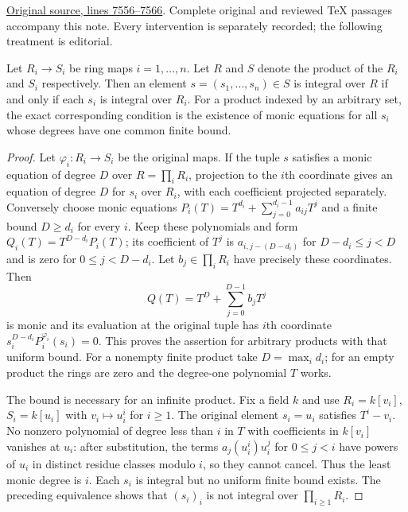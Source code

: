 \noindent\href{https://github.com/stacks/stacks-project/blob/a04446e57ec1fbc252a871afcec7752fb2807b14/algebra.tex\#L7556}{Original source, lines 7556--7566}. Complete original and reviewed TeX passages accompany this note. Every intervention is separately recorded; the following treatment is editorial.


\begin{lemma}
\label{editorial-source-lemma-finite-product-integral}
Let $R_i\to S_i$ be ring maps $i = 1, \ldots, n$.
Let $R$ and $S$ denote the product of the $R_i$ and $S_i$ respectively.
Then an element $s = (s_1, \ldots, s_n) \in S$ is integral over $R$
if and only if each $s_i$ is integral over $R_i$.
For a product indexed by an arbitrary set, the exact corresponding
condition is the existence of monic equations for all $s_i$ whose
degrees have one common finite bound.
\end{lemma}

\begin{proof}
Let $\varphi_i:R_i\to S_i$ be the original maps. If the tuple $s$
satisfies a monic equation of degree $D$ over $R=\prod_iR_i$,
projection to the $i$th coordinate gives an equation of degree $D$
for $s_i$ over $R_i$, with each coefficient projected separately.
Conversely choose monic equations
$P_i(T)=T^{d_i}+\sum_{j=0}^{d_i-1}a_{ij}T^j$ and a finite bound
$D\geq d_i$ for every $i$. Keep these polynomials and form
$Q_i(T)=T^{D-d_i}P_i(T)$; its coefficient of $T^j$ is
$a_{i,j-(D-d_i)}$ for $D-d_i\leq j<D$ and is zero for
$0\leq j<D-d_i$. Let $b_j\in\prod_iR_i$ have precisely these
coordinates. Then
$$
Q(T)=T^D+\sum_{j=0}^{D-1}b_jT^j
$$
is monic and its evaluation at the original tuple has $i$th coordinate
$s_i^{D-d_i}P_i^{\varphi_i}(s_i)=0$. This proves the assertion for
arbitrary products with that uniform bound. For a nonempty finite
product take $D=\max_i d_i$; for an empty product the rings are zero
and the degree-one polynomial $T$ works.

The bound is necessary for an infinite product. Fix a field $k$ and
use $R_i=k[v_i]$, $S_i=k[u_i]$ with $v_i\mapsto u_i^i$ for $i\geq1$.
The original element $s_i=u_i$ satisfies $T^i-v_i$.
No nonzero polynomial of degree less than $i$ in $T$ with
coefficients in $k[v_i]$ vanishes at $u_i$: after substitution,
the terms $a_j(u_i^i)u_i^j$ for $0\leq j<i$ have powers of $u_i$
in distinct residue classes modulo $i$, so they cannot cancel.
Thus the least monic degree is $i$. Each $s_i$ is integral but
no uniform finite bound exists. The preceding equivalence shows
that $(s_i)_i$ is not integral over $\prod_{i\geq1}R_i$.
\end{proof}


